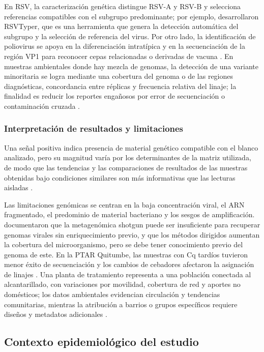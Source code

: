 En RSV, la caracterización genética distingue RSV-A y RSV-B y selecciona referencias compatibles con el subgrupo predominante; por ejemplo,  desarrollaron RSVTyper, que es una herramienta que genera la detección automática del subgrupo y la selección de referencia del virus. Por otro lado, la identificación de poliovirus se apoya en la diferenciación intratípica y en la secuenciación de la región VP1 para reconocer cepas relacionadas o derivadas de vacuna \cite{Asghar_2014,Klapsa_2022}. En muestras ambientales donde hay mezcla de genomas, la detección de una variante minoritaria se logra mediante una cobertura del genoma o de las regiones diagnósticas, concordancia entre réplicas y frecuencia relativa del linaje; la finalidad es reducir los reportes engañosos por error de secuenciación o contaminación cruzada \cite{Dash_2024,Child_2023}.

\subsubsection{Interpretación de resultados y limitaciones}

Una señal positiva indica presencia de material genético compatible con el blanco analizado, pero su magnitud varía por los determinantes de la matriz utilizada, de modo que las tendencias y las comparaciones de resultados de las muestras obtenidas bajo condiciones similares son más informativas que las lecturas aisladas \cite{Parkins_2023,Hughes_2022}.

Las limitaciones genómicas se centran en la baja concentración viral, el ARN fragmentado, el predominio de material bacteriano y los sesgos de amplificación.  documentaron que la metagenómica shotgun puede ser insuficiente para recuperar genomas virales sin enriquecimiento previo, y que los métodos dirigidos aumentan la cobertura del microorganismo, pero se debe tener conocimiento previo del genoma de este. En la PTAR Quitumbe, las muestras con Cq tardíos tuvieron menor éxito de secuenciación y los cambios de cebadores afectaron la asignación de linajes \cite{MejiaCalle_2024}. Una planta de tratamiento representa a una población conectada al alcantarillado, con variaciones por movilidad, cobertura de red y aportes no domésticos; los datos ambientales evidencian circulación y tendencias comunitarias, mientras la atribución a barrios o grupos específicos requiere diseños y metadatos adicionales \cite{Parkins_2023,Sims_2020}.

\subsection{Contexto epidemiológico del estudio}

